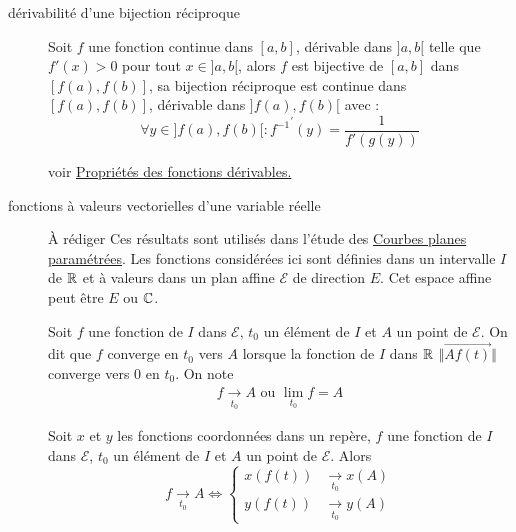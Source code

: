 \begin{description}
\item[dérivabilité d'une bijection réciproque] 
\begin{thm}
 Soit $f$ une fonction continue dans $[a,b]$, dérivable dans $]a,b[$ telle que $f'(x)>0$ pour tout $x\in]a,b[$, alors $f$ est bijective de $[a,b]$ dans $[f(a),f(b)]$, sa bijection réciproque est continue dans $[f(a),f(b)]$, dérivable dans $]f(a),f(b)[$ avec :
\begin{displaymath}
 \forall y \in ]f(a),f(b)[ : {f^{-1}}^\prime(y) = \dfrac{1}{f'(g(y))}
\end{displaymath}
\end{thm}
voir \href{\baseurl C2070.pdf}{Propriétés des fonctions dérivables.}
 

\item[fonctions à valeurs vectorielles d'une variable réelle]
\`A rédiger\newline
Ces résultats sont utilisés dans l'étude des \href{\baseurl C1618.pdf}{Courbes planes paramétrées}.\newline
Les fonctions considérées ici sont définies dans un intervalle $I$ de $\mathbb{R}$ et à valeurs dans un plan affine $\mathcal E$ de direction $E$. Cet espace affine peut être $E$ ou $\mathbb{C}$.
\begin{defi}
 Soit $f$ une fonction de $I$ dans $\mathcal E$, $t_0$ un élément de $I$ et $A$ un point de $\mathcal E$. On dit que $f$ converge en $t_0$ vers $A$ lorsque la fonction de $I$ dans $\mathbb{R}$  $\Vert \overrightarrow{Af(t)}\Vert$ converge vers $0$ en $t_0$. On note
\begin{align*}
 f \xrightarrow[t_0]{} A \text{ ou } \underset{t_0}{\lim} f = A 
\end{align*}
\end{defi}
\begin{prop}
Soit $x$ et $y$ les fonctions coordonnées dans un repère, $f$ une fonction de $I$ dans $\mathcal E$, $t_0$ un élément de $I$ et $A$ un point de $\mathcal E$. Alors
\begin{displaymath}
 f \xrightarrow[t_0]{} A \Leftrightarrow
\left\lbrace
\begin{aligned}
 x(f(t)) &\xrightarrow[t_0]{} x(A) \\
 y(f(t)) &\xrightarrow[t_0]{} y(A)
\end{aligned}
\right.  
\end{displaymath}
\end{prop}
\begin{demo}

\end{demo}
\end{description}
